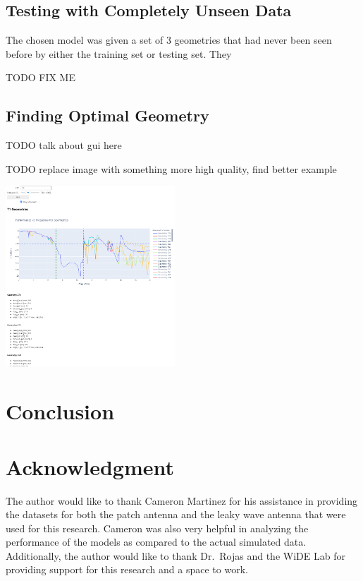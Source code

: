 \documentclass[lettersize,journal]{IEEEtran}
\newenvironment{Figure}
    {\par\medskip\noindent\minipage{\linewidth}}
    {\endminipage\par\medskip}
\begin{document}
\subsection{Testing with Completely Unseen Data}
The chosen model was given a set of 3 geometries that had never been seen before by either the training set or testing set. They 

TODO FIX ME 

\subsection{Finding Optimal Geometry}
TODO talk about gui here 

TODO replace image with something more high quality, find better example 

\begin{Figure}
    \centering
    \includegraphics[width=2.5in]{gui}
    \label{gui}
\end{Figure}


\section{Conclusion}


\section*{Acknowledgment}
The author would like to thank Cameron Martinez for his assistance in providing the datasets for both the patch antenna and the leaky wave antenna that were used for this research. Cameron was also very helpful in analyzing the performance of the models as compared to the actual simulated data. Additionally, the author would like to thank Dr.~Rojas and the WiDE Lab for providing support for this research and a space to work.





\vfill
\end{document}

